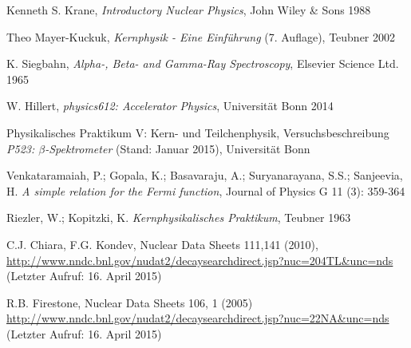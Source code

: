\documentclass[11pt, a4paper]{article}
\numberwithin{equation}{section}
\begin{document}
\FloatBarrier
\vspace{\fill}
\begin{thebibliography}{19}

	Kenneth S. Krane,
	\emph{Introductory Nuclear Physics},
	John Wiley \& Sons 1988

	Theo Mayer-Kuckuk,
	\emph{Kernphysik - Eine Einführung} (7. Auflage),
	Teubner 2002

	K. Siegbahn,
	\emph{Alpha-, Beta- and Gamma-Ray Spectroscopy},
	Elsevier Science Ltd. 1965

	W. Hillert,
	\emph{physics612: Accelerator Physics},
	Universität Bonn 2014

	Physikalisches Praktikum V: Kern- und Teilchenphysik,
	Versuchsbeschreibung \emph{P523: $\beta$-Spektrometer} (Stand: Januar 2015),
	Universität Bonn	

	Venkataramaiah, P.; Gopala, K.; Basavaraju, A.; Suryanarayana, S.S.; Sanjeevia, H.
	\emph{A simple relation for the Fermi function},
	Journal of Physics G 11 (3): 359-364

	Riezler, W.; Kopitzki, K.
	\emph{Kernphysikalisches Praktikum},
	Teubner 1963

  C.J. Chiara, F.G. Kondev,
  Nuclear Data Sheets 111,141 (2010),
  \url{http://www.nndc.bnl.gov/nudat2/decaysearchdirect.jsp?nuc=204TL&unc=nds}
  (Letzter Aufruf: 16. April 2015)

  R.B. Firestone,
  Nuclear Data Sheets 106, 1 (2005)
  \url{http://www.nndc.bnl.gov/nudat2/decaysearchdirect.jsp?nuc=22NA&unc=nds}
  (Letzter Aufruf: 16. April 2015)




  

\end{thebibliography}
\end{document}
